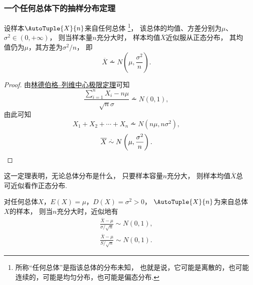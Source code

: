 \subsubsection{一个任何总体下的抽样分布定理}
\begin{theorem}
设样本\(\AutoTuple{X}{n}\)来自任何总体%
\footnote{所称“任何总体”是指该总体的分布未知，
也就是说，它可能是离散的，也可能连续的，可能是均匀分布，也可能是偏态分布.}，
该总体的均值、方差分别为\(\mu\)、\(\sigma^2\in(0,+\infty)\)，
则当样本量\(n\)充分大时，
样本均值\(\overline{X}\)近似服从正态分布，
其均值仍为\(\mu\)，其方差为\(\sigma^2/n\)，
即\begin{equation}
	\overline{X}
	\dotsim
	N\left(\mu,\frac{\sigma^2}{n}\right).
\end{equation}
\begin{proof}
由\hyperref[theorem:极限定理.林德伯格--列维中心极限定理]{林德伯格--列维中心极限定理}可知\[
	\frac{\sum_{i=1}^n X_i - n\mu}{\sqrt{n} \sigma} \dotsim N(0,1),
\]
由此可知\[
	X_1+X_2+\dotsb+X_n \dotsim N(n\mu,n\sigma^2),
\]\[
	\overline{X} \overset{.}{\sim} N\left(\mu,\frac{\sigma^2}{n}\right).
	\qedhere
\]
\end{proof}
\end{theorem}
这一定理表明，无论总体分布是什么，
只要样本容量\(n\)充分大，
则样本均值\(\overline{X}\)总可近似看作正态分布.

\begin{theorem}
对任何总体\(X\)，\(E(X)=\mu\)，\(D(X)=\sigma^2>0\)，
\(\AutoTuple{X}{n}\)为来自总体\(X\)的样本，
则当\(n\)充分大时，近似地有\begin{gather}
	\frac{\overline{X}-\mu}{\sigma/\sqrt{n}} \sim N(0,1), \\
	\frac{\overline{X}-\mu}{S/\sqrt{n}} \sim N(0,1).
\end{gather}
\end{theorem}
